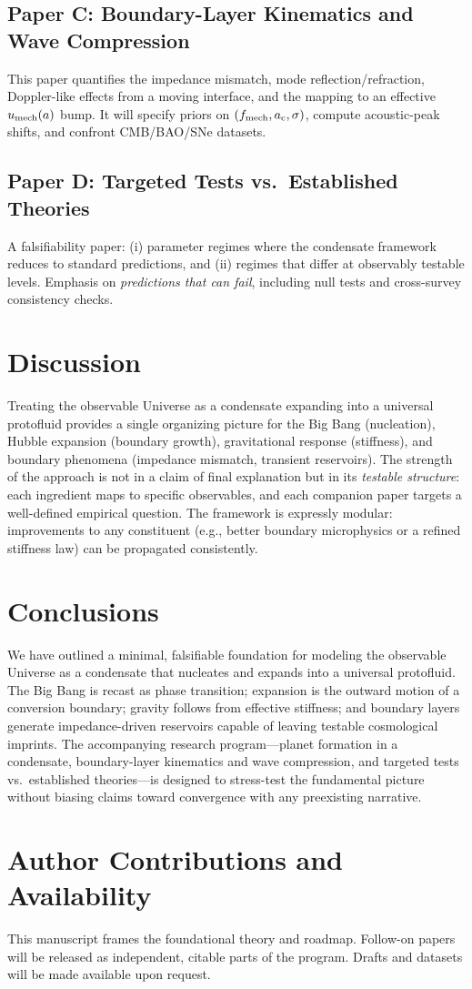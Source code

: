 \documentclass[11pt,a4paper]{article}
\newcommand{\ac}{a_{\rm c}}
\begin{document}
\subsection*{Paper C: Boundary-Layer Kinematics and Wave Compression}
This paper quantifies the impedance mismatch, mode reflection/refraction, Doppler-like effects from a moving interface, and the mapping to an effective $u_{\rm mech}(a)$ bump. It will specify priors on $(f_{\rm mech},\ac,\sigma)$, compute acoustic-peak shifts, and confront CMB/BAO/SNe datasets.

\subsection*{Paper D: Targeted Tests vs.\ Established Theories}
A falsifiability paper: (i) parameter regimes where the condensate framework reduces to standard predictions, and (ii) regimes that differ at observably testable levels. Emphasis on \emph{predictions that can fail}, including null tests and cross-survey consistency checks.

\section{Discussion}
Treating the observable Universe as a condensate expanding into a universal protofluid provides a single organizing picture for the Big Bang (nucleation), Hubble expansion (boundary growth), gravitational response (stiffness), and boundary phenomena (impedance mismatch, transient reservoirs). The strength of the approach is not in a claim of final explanation but in its \emph{testable structure}: each ingredient maps to specific observables, and each companion paper targets a well-defined empirical question. The framework is expressly modular: improvements to any constituent (e.g., better boundary microphysics or a refined stiffness law) can be propagated consistently.

\section{Conclusions}
We have outlined a minimal, falsifiable foundation for modeling the observable Universe as a condensate that nucleates and expands into a universal protofluid. The Big Bang is recast as phase transition; expansion is the outward motion of a conversion boundary; gravity follows from effective stiffness; and boundary layers generate impedance-driven reservoirs capable of leaving testable cosmological imprints. The accompanying research program---planet formation in a condensate, boundary-layer kinematics and wave compression, and targeted tests vs.\ established theories---is designed to stress-test the fundamental picture without biasing claims toward convergence with any preexisting narrative.

\section*{Author Contributions and Availability}
This manuscript frames the foundational theory and roadmap. Follow-on papers will be released as independent, citable parts of the program. Drafts and datasets will be made available upon request.
\end{document}
